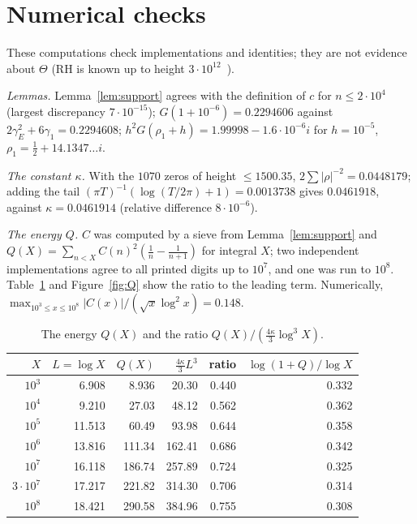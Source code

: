 \documentclass[11pt]{amsart}
\theoremstyle{remark}
\theoremstyle{definition}
\newcommand{\gE}{\gamma_E}
\begin{document}
\section{Numerical checks}\label{sec:num}

These computations check implementations and identities; they are not evidence about $\Theta$ (RH is known up to height $3\cdot10^{12}$~\cite{PT21}).

\emph{Lemmas.} Lemma~\ref{lem:support} agrees with the definition of $c$ for $n\le2\cdot10^4$ (largest discrepancy $7\cdot10^{-15}$); $G(1+10^{-6})=0.2294606$ against $2\gE^2+6\gamma_1=0.2294608$; $h^2G(\rho_1+h)=1.99998-1.6\cdot10^{-6}i$ for $h=10^{-5}$, $\rho_1=\frac12+14.1347\ldots i$.

\emph{The constant $\kappa$.} With the $1070$ zeros of height $\le1500.35$, $2\sum|\rho|^{-2}=0.0448179$; adding the tail $(\pi T)^{-1}(\log(T/2\pi)+1)=0.0013738$ gives $0.0461918$, against $\kappa=0.0461914$ (relative difference $8\cdot10^{-6}$).

\emph{The energy $Q$.} $C$ was computed by a sieve from Lemma~\ref{lem:support} and $Q(X)=\sum_{n<X}C(n)^2(\frac1n-\frac1{n+1})$ for integral $X$; two independent implementations agree to all printed digits up to $10^7$, and one was run to $10^8$. Table~\ref{tab:Q} and Figure~\ref{fig:Q} show the ratio to the leading term. Numerically, $\max_{10^3\le x\le10^8}|C(x)|/(\sqrt x\log^2x)=0.148$.

\begin{table}[h]
\centering\small
\begin{tabular}{rrrrrr}
\toprule
$X$ & $L=\log X$ & $Q(X)$ & $\frac{4\kappa}3L^3$ & ratio & $\log(1+Q)/\log X$\\
\midrule
$10^3$ & 6.908 & 8.936 & 20.30 & 0.440 & 0.332\\
$10^4$ & 9.210 & 27.03 & 48.12 & 0.562 & 0.362\\
$10^5$ & 11.513 & 60.49 & 93.98 & 0.644 & 0.358\\
$10^6$ & 13.816 & 111.34 & 162.41 & 0.686 & 0.342\\
$10^7$ & 16.118 & 186.74 & 257.89 & 0.724 & 0.325\\
$3\cdot10^7$ & 17.217 & 221.82 & 314.30 & 0.706 & 0.314\\
$10^8$ & 18.421 & 290.58 & 384.96 & 0.755 & 0.308\\
\bottomrule
\end{tabular}
\caption{The energy $Q(X)$ and the ratio $Q(X)/(\frac{4\kappa}3\log^3X)$.}\label{tab:Q}
\end{table}
\end{document}
